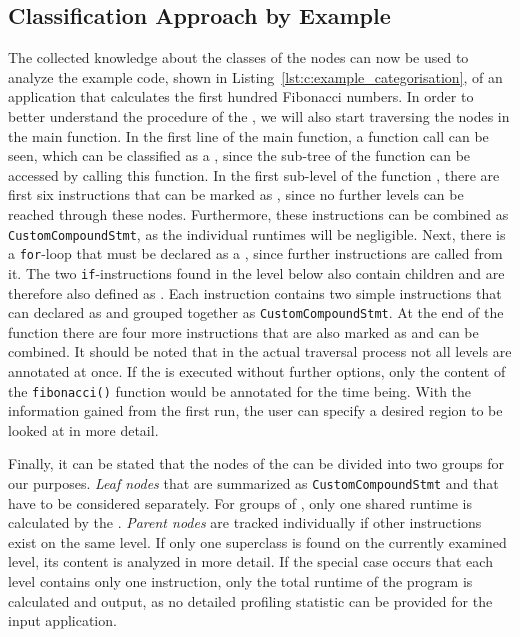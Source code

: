 \subsection{Classification Approach by Example}
The collected knowledge about the classes of the nodes can now be used to analyze the example code, shown in Listing~\ref{lst:c:example_categorisation}, of an application that calculates the first hundred Fibonacci numbers. In order to better understand the procedure of the \TOOL, we will also start traversing the nodes in the main function. In the first line of the main function, a function call can be seen, which can be classified as a \PARSTA, since the sub-tree of the function \DECL can be accessed by calling this function. In the first sub-level of the function \DECL, there are first six instructions that can be marked as \LEASTAS, since no further levels can be reached through these nodes. Furthermore, these instructions can be combined as \lstinline{CustomCompoundStmt}, as the individual runtimes will be negligible. Next, there is a \lstinline{for}-loop that must be declared as a \PARSTA, since further instructions are called from it. The two \lstinline{if}-instructions found in the level below also contain children and are therefore also defined as \PARSTAS. Each instruction contains two simple instructions that can declared as \LEASTA and grouped together as \lstinline{CustomCompoundStmt}. At the end of the function there are four more instructions that are also marked as \LEASTAS and can be combined. It should be noted that in the actual traversal process not all levels are annotated at once. If the \TOOL is executed without further options, only the content of the \lstinline{fibonacci()} function would be annotated for the time being. With the information gained from the first run, the user can specify a desired region to be looked at in more detail. 

Finally, it can be stated that the nodes of the \astsmall can be divided into two groups for our purposes. \emph{Leaf nodes} that are summarized as \lstinline{CustomCompoundStmt} and \PARSTAS that have to be considered separately. For groups of \LEASTAS, only one shared runtime is calculated by the \TOOL. \emph{Parent nodes} are tracked individually if other instructions exist on the same level. If only one superclass is found on the currently examined level, its content is analyzed in more detail. If the special case occurs that each level contains only one instruction, only the total runtime of the program is calculated and output, as no detailed profiling statistic can be provided for the input application. 

